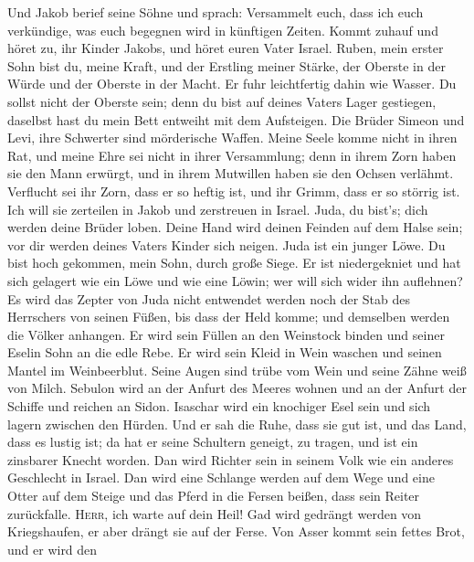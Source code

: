  Und Jakob berief seine Söhne und sprach: Versammelt euch,
dass ich euch verkündige, was euch begegnen wird in künftigen Zeiten.
 Kommt zuhauf und höret zu, ihr Kinder Jakobs, und höret
euren Vater Israel.  Ruben, mein erster Sohn bist du,
meine Kraft, und der Erstling meiner Stärke, der Oberste in der Würde
und der Oberste in der Macht.  Er fuhr leichtfertig dahin
wie Wasser. Du sollst nicht der Oberste sein; denn du bist auf deines
Vaters Lager gestiegen, daselbst hast du mein Bett entweiht mit dem
Aufsteigen.  Die Brüder Simeon und Levi, ihre Schwerter
sind mörderische Waffen.  Meine Seele komme nicht in ihren
Rat, und meine Ehre sei nicht in ihrer Versammlung; denn in ihrem Zorn
haben sie den Mann erwürgt, und in ihrem Mutwillen haben sie den Ochsen
verlähmt.  Verflucht sei ihr Zorn, dass er so heftig ist,
und ihr Grimm, dass er so störrig ist. Ich will sie zerteilen in Jakob
und zerstreuen in Israel.  Juda, du bist's; dich werden
deine Brüder loben. Deine Hand wird deinen Feinden auf dem Halse sein;
vor dir werden deines Vaters Kinder sich neigen.  Juda ist
ein junger Löwe. Du bist hoch gekommen, mein Sohn, durch große Siege. Er
ist niedergekniet und hat sich gelagert wie ein Löwe und wie eine Löwin;
wer will sich wider ihn auflehnen?  Es wird das Zepter
von Juda nicht entwendet werden noch der Stab des Herrschers von seinen
Füßen, bis dass der Held komme; und demselben werden die Völker
anhangen.  Er wird sein Füllen an den Weinstock binden
und seiner Eselin Sohn an die edle Rebe. Er wird sein Kleid in Wein
waschen und seinen Mantel im Weinbeerblut.  Seine Augen
sind trübe vom Wein und seine Zähne weiß von Milch. 
Sebulon wird an der Anfurt des Meeres wohnen und an der Anfurt der
Schiffe und reichen an Sidon.  Isaschar wird ein
knochiger Esel sein und sich lagern zwischen den Hürden. 
Und er sah die Ruhe, dass sie gut ist, und das Land, dass es lustig ist;
da hat er seine Schultern geneigt, zu tragen, und ist ein zinsbarer
Knecht worden.  Dan wird Richter sein in seinem Volk wie
ein anderes Geschlecht in Israel.  Dan wird eine Schlange
werden auf dem Wege und eine Otter auf dem Steige und das Pferd in die
Fersen beißen, dass sein Reiter zurückfalle. 
\textsc{Herr}, ich warte auf dein Heil!  Gad wird
gedrängt werden von Kriegshaufen, er aber drängt sie auf der Ferse.
 Von Asser kommt sein fettes Brot, und er wird den
